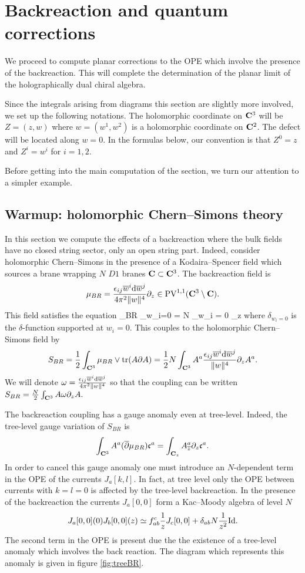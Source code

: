 \documentclass[../main.tex]{subfiles}
\begin{document}
\section{Backreaction and quantum corrections}
\label{sec:br}

We proceed to compute planar corrections to the OPE which involve the presence of the backreaction. 
This will complete the determination of the planar limit of the holographically dual chiral algebra.

Since the integrals arising from diagrams this section are slightly more involved, we set up the following notations.
The holomorphic coordinate on $\mathbf{C}^3$ will be $Z = (z , w)$ where $w = (w^1,w^2)$ is a holomorphic coordinate on $\mathbf{C}^2$.
The defect will be located along $w = 0$.
In the formulas below, our convention is that $Z^0 = z$ and $Z^i = w^i$ for $i=1,2$.

Before getting into the main computation of the section, we turn our attention to a simpler example.

\subsection{Warmup: holomorphic Chern--Simons theory}

In this section we compute the effects of a backreaction where the bulk fields have no closed string sector, only an open string part. 
Indeed, consider holomorphic Chern--Simons in the presence of a Kodaira--Spencer field which sources a brane wrapping $N$ $D1$ branes $\mathbf{C} \subset \mathbf{C}^3$. 
The backreaction field is 
\[
\mu_{BR} = \frac{{\epsilon}_{ij} \overline{w}^i \mathrm{d} \overline{w}^j}{4 \pi^2 \|w\|^4} \partial_z \in {\rm PV}^{1,1} (\mathbf{C}^3 \setminus \mathbf{C}) . 
\]
This field satisfies the equation
\beqn\label{eqn:csBR}
\dbar \mu_{BR} \wedge \Omega_{w_i=0} = N \delta_{w_i = 0} \del_z 
\eeqn
where $\delta_{w_i=0}$ is the $\delta$-function supported at $w_i=0$.
This couples to the holomorphic Chern--Simons field by 
\[
S_{BR} = \frac12 \int_{\mathbf{C}^3} \mu_{BR} \vee \operatorname{tr}(A \partial A) = \frac12 N \int_{\mathbf{C}^3} A^a \frac{{\epsilon}_{ij} \overline{w}^i \mathrm{d} \overline{w}^j}{\|w\|^4} \partial_z A^a .
\]
We will denote $\omega = \frac{{\epsilon}_{ij} \overline{w}^i \mathrm{d} \overline{w}^j}{4 \pi^2\|w\|^4}$ so that the coupling can be written $S_{BR} = \frac{N}{2}
\int_{\mathbf{C}^3} A \omega \partial_z A.$

The backreaction coupling has a gauge anomaly even at tree-level.
Indeed, the tree-level gauge variation of $S_{BR}$ is
\[
\int_{\mathbf{C}^3} A^a (\overline{\partial} \mu_{BR}) \mathfrak{c}^a = \int_{\mathbf{C}_z} A_{{\overline{z}}}^a \partial_z \mathfrak{c}^a .
\]
In order to cancel this gauge anomaly one must introduce an $N$-dependent term in the OPE of the currents $J_a[k,l]$. 
In fact, at tree level only the OPE between currents with $k=l=0$ 
is affected by the tree-level backreaction.
In the presence of the backreaction the currents $J_a[0,0]$ form a Kac--Moody algebra of level $N$
\[
J_a[0,0] (0) J_b [0,0] (z) \simeq f_{ab}^c \frac1z J_c[0,0] + \delta_{ab} N \frac1{z^2} {\rm Id} .
\]
The second term in the OPE is present due the the existence of a tree-level anomaly which involves the back reaction.
The diagram which represents this anomaly is given in figure \ref{fig:treeBR}.
\end{document}
